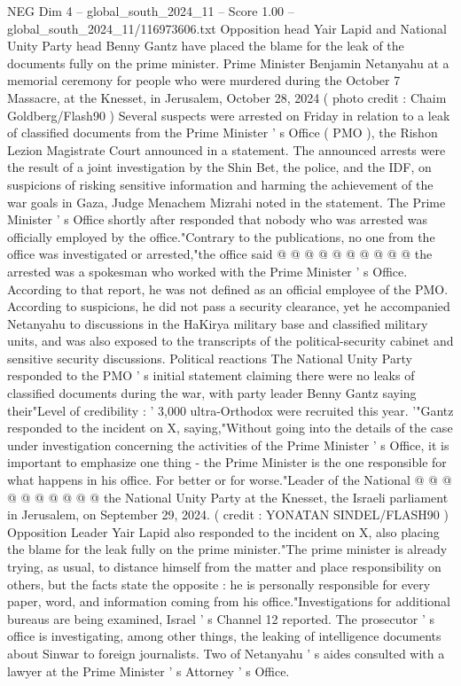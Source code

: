 \begin{textsample}{NEG Dim 4 – global\_south\_2024\_11 – Score 1.00 – global\_south\_2024\_11/116973606.txt}  \label{ex:f4_neg_204}
Opposition head Yair Lapid and National Unity Party head Benny Gantz have placed the blame for the leak of the documents fully on the prime minister.
Prime Minister Benjamin Netanyahu at a memorial ceremony for people who were murdered during the October 7 Massacre, at the Knesset, in Jerusalem, October 28, 2024 ( photo credit : Chaim Goldberg/Flash90 ) Several suspects were arrested on Friday in relation to a leak of classified documents from the Prime Minister ' s Office ( PMO ), the Rishon Lezion Magistrate Court announced in a statement.
The announced arrests were the result of a joint investigation by the Shin Bet, the police, and the IDF, on suspicions of risking sensitive information and harming the achievement of the war goals in Gaza, Judge Menachem Mizrahi noted in the statement.
The Prime Minister ' s Office shortly after responded that nobody who was arrested was officially employed by the office."Contrary to the publications, no one from the office was investigated or arrested,"the office said @ @ @ @ @ @ @ @ @ @ the arrested was a spokesman who worked with the Prime Minister ' s Office.
According to that report, he was not defined as an official employee of the PMO.
According to suspicions, he did not pass a security clearance, yet he accompanied Netanyahu to discussions in the HaKirya military base and classified military units, and was also exposed to the transcripts of the political-security cabinet and sensitive security discussions.
Political reactions The National Unity Party responded to the PMO ' s initial statement claiming there were no leaks of classified documents during the war, with party leader Benny Gantz saying their"Level of credibility : ' 3,000 ultra-Orthodox were recruited this year. '"Gantz responded to the incident on X, saying,"Without going into the details of the case under investigation concerning the activities of the Prime Minister ' s Office, it is important to emphasize one thing - the Prime Minister is the one responsible for what happens in his office.
For better or for worse."Leader of the National @ @ @ @ @ @ @ @ @ @ the National Unity Party at the Knesset, the Israeli parliament in Jerusalem, on September 29, 2024. ( credit : YONATAN SINDEL/FLASH90 ) Opposition Leader Yair Lapid also responded to the incident on X, also placing the blame for the leak fully on the prime minister."The prime minister is already trying, as usual, to distance himself from the matter and place responsibility on others, but the facts state the opposite : he is personally responsible for every paper, word, and information coming from his office."Investigations for additional bureaus are being examined, Israel ' s Channel 12 reported.
The prosecutor ' s office is investigating, among other things, the leaking of intelligence documents about Sinwar to foreign journalists.
Two of Netanyahu ' s aides consulted with a lawyer at the Prime Minister ' s Attorney ' s Office.

\end{textsample}
